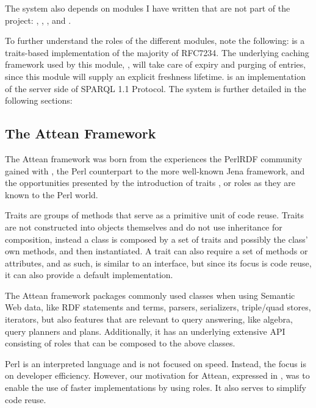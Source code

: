 The system also depends on modules I have written that are not part of
the project: , , ,
 and .

To further understand the roles of the different modules, note the
following:  is a traits-based
\cite{traits} implementation of the majority of RFC7234.
The underlying caching framework used by this module, ,
will take care of expiry and purging of entries, since this module
will supply an explicit freshness lifetime. 
 is an implementation of the server side of
SPARQL 1.1 Protocol. The system is further detailed in the following sections:

\subsection{The Attean Framework}\label{sec:attean}

The Attean framework was born from the experiences the PerlRDF
community gained with , the Perl counterpart to
the more well-known Jena framework, and the opportunities presented by
the introduction of traits \cite{traits}, or roles as they are known
to the Perl world.

Traits are groups of methods that serve as a primitive unit of code
reuse. Traits are not constructed into objects themselves and do not
use inheritance for composition, instead a class is composed by a set
of traits and possibly the class' own methods, and then
instantiated. A trait can also require a set of methods or attributes,
and as such, is similar to an interface, but since its focus is code
reuse, it can also provide a default implementation.

The Attean framework packages commonly used classes when using
Semantic Web data, like RDF statements and terms, parsers,
serializers, triple/quad stores, iterators, but also features that are
relevant to query answering, like algebra, query planners and
plans. Additionally, it has an underlying extensive API consisting of
roles that can be composed to the above classes.

Perl is an interpreted language and is not focused on speed. Instead,
the focus is on developer efficiency. However, our motivation for
Attean, expressed in \cite{williamspushing}, was to enable the use
of faster implementations by using roles. It also serves to simplify 
code reuse.

